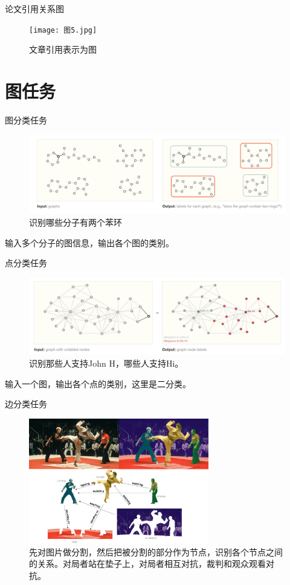 \documentclass{beamer}
\begin{document}
\begin{frame}{论文引用关系图}
    \begin{figure}
        \texttt{[image: 图5.jpg]}
        \caption{文章引用表示为图}
    \end{figure}
\end{frame}

\section{图任务}

\begin{frame}{图分类任务}
    \begin{figure}
        \includegraphics[width=\textwidth]{全局分类.jpg}
        \caption{识别哪些分子有两个苯环}
    \end{figure}
    输入多个分子的图信息，输出各个图的类别。
\end{frame}

\begin{frame}{点分类任务}
    \begin{figure}
        \includegraphics[width=\textwidth]{点分类.jpg}
        \caption{识别那些人支持John H，哪些人支持Hi。}
    \end{figure}
    输入一个图，输出各个点的类别，这里是二分类。
\end{frame}

\begin{frame}{边分类任务}
    \begin{figure}
        \includegraphics[width=0.7\textwidth]{边分类.jpg}
        \caption{先对图片做分割，然后把被分割的部分作为节点，识别各个节点之间的关系。对局者站在垫子上，对局者相互对抗，裁判和观众观看对抗。}
    \end{figure}
\end{frame}
\end{document}
